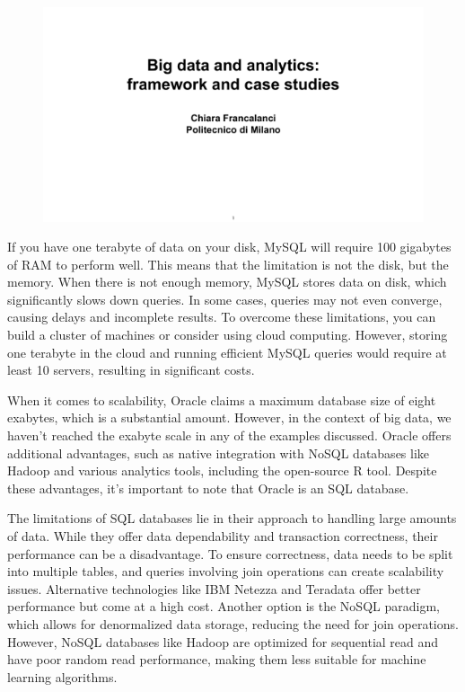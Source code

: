 \begin{figure}[!h]
    \centering
    \includegraphics[page=45, trim = 1.5cm 1.7cm 1cm 3.5cm, clip, width=\textwidth]{images/06 - BIG_DATA.pdf}
\end{figure}

If you have one terabyte of data on your disk, MySQL will require 100
gigabytes of RAM to perform well. This means that the limitation is not
the disk, but the memory. When there is not enough memory, MySQL stores
data on disk, which significantly slows down queries. In some cases,
queries may not even converge, causing delays and incomplete results. To
overcome these limitations, you can build a cluster of machines or
consider using cloud computing. However, storing one terabyte in the
cloud and running efficient MySQL queries would require at least 10
servers, resulting in significant costs.

When it comes to scalability, Oracle claims a maximum database size of
eight exabytes, which is a substantial amount. However, in the context
of big data, we haven't reached the exabyte scale in any of the examples
discussed. Oracle offers additional advantages, such as native
integration with NoSQL databases like Hadoop and various analytics
tools, including the open-source R tool. Despite these advantages, it's
important to note that Oracle is an SQL database.

The limitations of SQL databases lie in their approach to handling large
amounts of data. While they offer data dependability and transaction
correctness, their performance can be a disadvantage. To ensure
correctness, data needs to be split into multiple tables, and queries
involving join operations can create scalability issues. Alternative
technologies like IBM Netezza and Teradata offer better performance but
come at a high cost. Another option is the NoSQL paradigm, which allows
for denormalized data storage, reducing the need for join operations.
However, NoSQL databases like Hadoop are optimized for sequential read
and have poor random read performance, making them less suitable for
machine learning algorithms.


